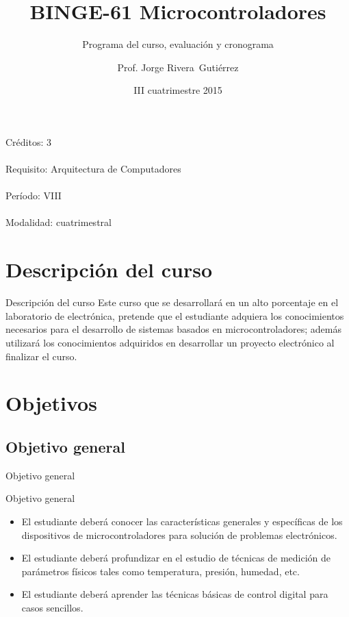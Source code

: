 \documentclass[xcolor=dvipsnames]{beamer}
\title[$\mu C$]{BINGE-61 Microcontroladores}
\subtitle{Programa del curso, evaluación y cronograma}
\author{Prof. Jorge Rivera~Guti\'errez}
\institute{Universidad Latina de Costa Rica\\ Ingenier\'\i a en Electr\'onica}
\date{III cuatrimestre 2015}
\newcommand{\pageframe}[1]{\frame{\begin{center}{ \Huge #1 }\end{center}}}
\begin{document}
\begin{frame}
 \maketitle
\end{frame}

\begin{frame}
 \begin{center}
  \Large Créditos: 3\\~\\
  Requisito: Arquitectura de Computadores\\~\\
  Período: VIII\\~\\
  Modalidad: cuatrimestral
 \end{center}
\end{frame}

\section{Descripción del curso}

\begin{frame}{Descripción del curso}
 Este curso  que se desarrollar\'a en un alto porcentaje en el laboratorio de electr\'onica, pretende que el estudiante adquiera los conocimientos necesarios para el desarrollo de sistemas basados en microcontroladores; adem\'as utilizar\'a los conocimientos adquiridos en desarrollar un proyecto electr\'onico al finalizar el curso.
\end{frame}

\section{Objetivos}

\pageframe{Objetivos}

\subsection{Objetivo general}

\begin{frame}{Objetivo general}
  \begin{block}{Objetivo general}
    \begin{itemize}
      \item El estudiante deberá conocer las características generales y específicas de los dispositivos de microcontroladores para solución de problemas electrónicos.
      \item El estudiante deberá profundizar en el estudio de técnicas de medición de parámetros físicos tales como temperatura, presión, humedad, etc.
      \item El estudiante deberá aprender las técnicas básicas de control digital para casos sencillos.
    \end{itemize}
  \end{block}
\end{frame}
\end{document}
